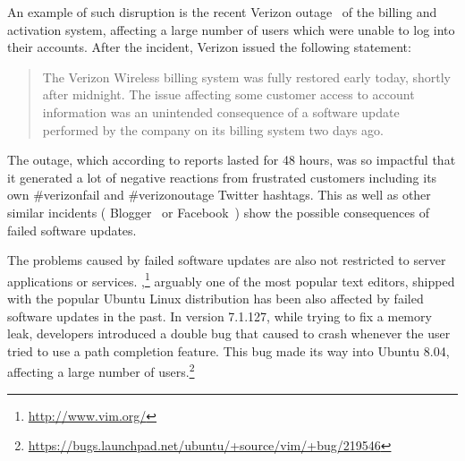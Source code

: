An example of such disruption is the recent Verizon
outage~\cite{verizon-outage2014} of the billing and activation system,
affecting a large number of users which were unable to log into their accounts.
After the incident, Verizon issued the following statement:
\begin{quotation}
The Verizon Wireless billing system was fully restored early today, shortly
after midnight. The issue affecting some customer access to account information
was an unintended consequence of a software update performed by the company on
its billing system two days ago.
\end{quotation}
The outage, which according to reports lasted for 48 hours, was so impactful
that it generated a lot of negative reactions from frustrated customers
including its own \textsf{\#verizonfail} and \textsf{\#verizonoutage} Twitter
hashtags.  This as well as other similar incidents (\eg
Blogger~\cite{blogger-incident2011} or Facebook~\cite{facebook-incident2010})
show the possible consequences of failed software updates.

The problems caused by failed software updates are also not restricted to
server applications or services. \vim,\footnote{\url{http://www.vim.org/}}
arguably one of the most popular text editors, shipped with the popular
Ubuntu Linux distribution has been also affected by failed software updates in
the past.  In version 7.1.127, while trying to fix a memory leak, \vim
developers introduced a double  bug that caused \vim to crash
whenever the user tried to use a path completion feature.  This bug made its
way into Ubuntu 8.04, affecting a large number of
users.\footnote{\url{https://bugs.launchpad.net/ubuntu/+source/vim/+bug/219546}}




